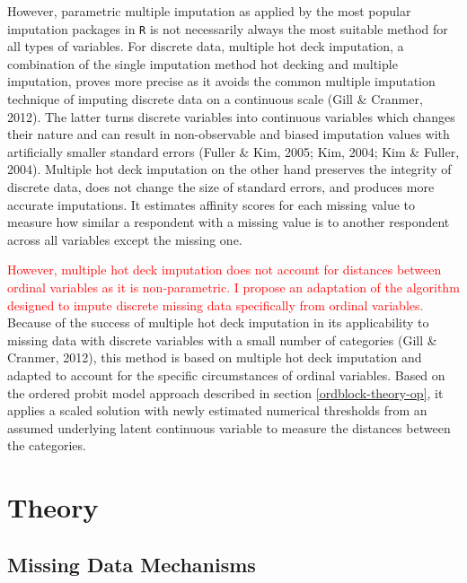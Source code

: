 \documentclass[12pt,econ]{sources/authesis}
\begin{document}
However, parametric multiple imputation as applied by the most popular imputation packages in \texttt{R} is not necessarily always the most suitable method for all types of variables. For discrete data, multiple hot deck imputation, a combination of the single imputation method hot decking and multiple imputation, proves more precise as it avoids the common multiple imputation technique of imputing discrete data on a continuous scale (Gill \& Cranmer, 2012). The latter turns discrete variables into continuous variables which changes their nature and can result in non-observable and biased imputation values with artificially smaller standard errors (Fuller \& Kim, 2005; Kim, 2004; Kim \& Fuller, 2004). Multiple hot deck imputation on the other hand preserves the integrity of discrete data, does not change the size of standard errors, and produces more accurate imputations. It estimates affinity scores for each missing value to measure how similar a respondent with a missing value is to another respondent across all variables except the missing one.

\textcolor{red}{However, multiple hot deck imputation does not account for distances between ordinal variables as it is non-parametric. I propose an adaptation of the algorithm designed to impute discrete missing data specifically from ordinal variables.} Because of the success of multiple hot deck imputation in its applicability to missing data with discrete variables with a small number of categories (Gill \& Cranmer, 2012), this method is based on multiple hot deck imputation and adapted to account for the specific circumstances of ordinal variables. Based on the ordered probit model approach described in section \ref{ordblock-theory-op}, it applies a scaled solution with newly estimated numerical thresholds from an assumed underlying latent continuous variable to measure the distances between the categories.

\hypertarget{ordmiss-theory}{%
\section{Theory}\label{ordmiss-theory}}

\hypertarget{ordmiss-theory-mechanisms}{%
\subsection{Missing Data Mechanisms}\label{ordmiss-theory-mechanisms}}
\end{document}
